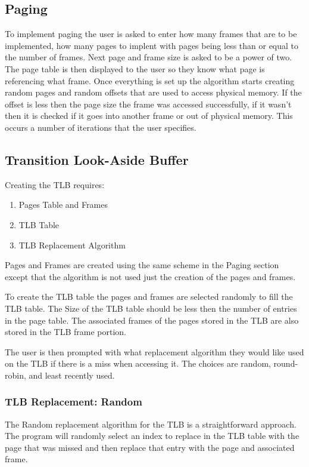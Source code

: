 \begin{multicols}{2}
\subsection{Paging}
To implement paging the user is asked to enter how many frames that are to be implemented, how many pages to implent with pages being less than or equal to the number of frames. Next page and frame size is asked to be a power of two. The page table is then displayed to the user so they know what page is referencing what frame. Once everything is set up the algorithm starts creating random pages and random offsets that are used to access physical memory. If the offset is less then the page size the frame was accessed successfully, if it wasn't then it is checked if it goes into another frame or out of physical memory. This occurs a number of iterations that the user specifies.

\subsection{Transition Look-Aside Buffer}
Creating the TLB requires:
\begin{enumerate}
\item Pages Table and Frames
\item TLB Table
\item TLB Replacement Algorithm
\end{enumerate}

Pages and Frames are created using the same scheme in the Paging section except that the algorithm is not used just the creation of the pages and frames.

To create the TLB table the pages and frames are selected randomly to fill the TLB table. The Size of the TLB table should be less then the number of entries in the page table. The associated frames of the pages stored in the TLB are also stored in the TLB frame portion.

The user is then prompted with what replacement algorithm they would like used on the TLB if there is a miss when accessing it. The choices are random, round-robin, and least recently used.


\subsubsection{TLB Replacement: Random}
The Random replacement algorithm for the TLB is a straightforward approach. The program will randomly select an index to replace in the TLB table with the page that was missed and then replace that entry with the page and associated frame.


\end{multicols}
